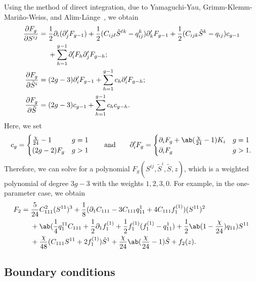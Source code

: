 \documentclass[10pt]{amsart}
\theoremstyle{definition}
\theoremstyle{remark}
\theoremstyle{plain}
\theoremstyle{definition}
\theoremstyle{remark}
\newcommand{\1}{\mathbf{1}}
\newcommand{\2}{\mathbf{2}}
\newcommand{\3}{\mathbf{3}}
\begin{document}
Using the method of direct integration, due to Yamaguchi-Yau, Grimm-Klemm-Mari\~{n}o-Weiss, and Alim-L\"ange~\cite{yy04,gkmw,alimlange}, we obtain
\begin{align*}
    \pdv{F_g}{S^{ij}} ={}& \frac{1}{2} \partial_i (\partial_j' F_{g-1}) +\frac{1}{2} (C_{ij\ell}\tilde{S}^{\ell k} - q_{ij}^k) \partial_k' F_{g-1} + \frac{1}{2} (C_{ijk}\tilde{S}^k - q_{ij}) c_{g-1} \\
    &+ \sum_{h=1}^{g-1} \partial_i' F_h \partial_j' F_{g-h}; \\
    \pdv{F_g}{\tilde{S}^i} ={}& (2g-3) \partial_i' F_{g-1} + \sum_{h=1}^{g-1} c_h \partial_i' F_{g-h}; \\
    \pdv{F_g}{\tilde{S}} ={}& (2g-3) c_{g-1} + \sum_{h=1}^{g-1} c_h c_{g-h}.
\end{align*}
Here, we set
\[ c_g = \begin{cases}
    \frac{\chi}{24}-1 & g=1 \\
    (2g-2) F_g & g > 1
\end{cases} \qquad  \text{and} \qquad \partial_i' F_g = \begin{cases}
    \partial_i F_g + \ab(\frac{\chi}{24}-1)K_i & g=1 \\
    \partial_i F_g & g > 1.
\end{cases}
\]
Therefore, we can solve for a polynomial $F_g(S^{ij}, \tilde{S}^i, \tilde{S}, z)$, which is a weighted polynomial of degree $3g-3$ with the weights $1,2,3,0$. For example, in the one-parameter case, we obtain
\begin{align*}
    F_2 ={}& \frac{5}{24} C_{111}^2 (S^{11})^3 + \frac{1}{8}(\partial_1 C_{111} - 3 C_{111}q_{11}^1 + 4 C_{111} f_1^{(1)})(S^{11})^2 \\
    &+ \ab(\frac{1}{4} q_1^{11} C_{111} + \frac{1}{2}\partial_1 f_1^{(1)} +\frac{1}{2} f_1^{(1)}(f_1^{(1)}- q_{11}^1) + \frac{1}{2} \ab(1-\frac{\chi}{24})q_{11})S^{11} \\
    &+ \frac{\chi}{48}(C_{111}S^{11}+2f_1^{(1)})\tilde{S}^1 + \frac{\chi}{24}\ab(\frac{\chi}{24}-1)\tilde{S} + f_2(z).
\end{align*}


\subsection{Boundary conditions}%
\label{sub:Boundary conditions}
\end{document}
